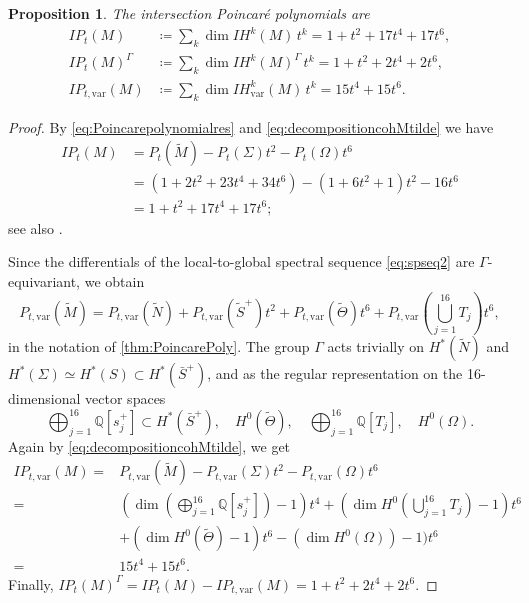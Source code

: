 \documentclass[JEP,XML,SOM,Unicode, NoEqCountersInSection,NoFloatCountersInSection,published]{cedram}
\let\ts\textstyle
\newcommand{\IH}{\mathit{IH}}
\newcommand{\IP}{\mathit{IP}}
\newtheorem{prop}[thm]{Proposition}
\theoremstyle{definition}
\newcommand{\QQ}{\mathbb{Q}}
\let\NBun N
\begin{document}
\begin{prop}\label{prop:Poincarepolynomialintersection}
The intersection Poincaré polynomials are
\begin{align*}
\IP_t(M) & \coloneqq \sum_k \dim \IH^k(M)\,t^k = 1+t^2+17t^4+17t^6, \\
\IP_t(M)^{\Gamma}& \coloneqq \sum_k \dim \IH^k(M)^{\Gamma} \,t^k = 1+t^2+2t^4+2t^6,\\
\IP_{t,{\mathrm{var}}}(M) & \coloneqq \sum_k \dim \IH^k_{\mathrm{var}}(M) \,t^k = 15t^4+15t^6.
\end{align*}
\end{prop}
\begin{proof}

By \eqref{eq:Poincarepolynomialres} and \eqref{eq:decompositioncohMtilde} we have
\begin{align*}
\IP_t(M) & =P_t(\widetilde{M})-P_t(\Sigma)t^2-P_t(\Omega)t^6\\
& = (1+2t^2+23t^4+34t^6)-(1+6t^2+1)t^2 - 16t^6\\
& = 1+t^2+17t^4+17t^6;
\end{align*}
see also \cite[Th.\,6.1]{Felisetti2018}.

Since the differentials of the local-to-global spectral sequence \eqref{eq:spseq2} are $\Gamma$\nobreakdash-equiva\-riant, we obtain
\[
P_{t, \mathrm{var}}(\widetilde{M}) =P_{t, \mathrm{var}}(\widetilde{\NBun}) + P_{t, \mathrm{var}}(\widetilde{S}^+)t^2 + P_{t, \mathrm{var}}(\widetilde{\Theta})t^6 + P_{t, \mathrm{var}}(\ts\bigcup^{16}_{j=1}T_j)t^6,
\]
in the notation of \cref{thm:PoincarePoly}. The group $\Gamma$ acts trivially on $H^*(\widetilde{N})$ and $H^*(\Sigma) \simeq H^*(S) \subset H^*(\bar{S}^+)$, and as the regular representation on the 16-dimensional vector spaces
\[
\bigoplus^{16}_{j=1}\QQ [s^+_j] \subset H^*(\bar{S}^+), \quad H^0(\widetilde{\Theta}), \quad \bigoplus^{16}_{j=1}\QQ [T_j], \quad H^0(\Omega).
\]
Again by \eqref{eq:decompositioncohMtilde}, we get
\begin{align*}
\IP_{t, \mathrm{var}}(M) = & P_{t, \mathrm{var}}(\widetilde{M}) -P_{t, \mathrm{var}}(\Sigma)t^2-P_{t, \mathrm{var}}(\Omega)t^6\\
= & \ts(\dim(\bigoplus^{16}_{j=1}\QQ [s^+_j])-1)t^4 + (\dim H^0(\bigcup^{16}_{j=1} T_j)-1)t^6 \\
& + (\dim H^0(\widetilde{\Theta})-1)t^6 - (\dim H^0(\Omega))-1)t^6\\
= & 15t^4+15t^6.
\end{align*}
Finally, $\IP_t(M)^{\Gamma} = \IP_t(M) - \IP_{t, \mathrm{var}}(M)= 1+t^2+2t^4+2t^6$.
\end{proof}
\end{document}
